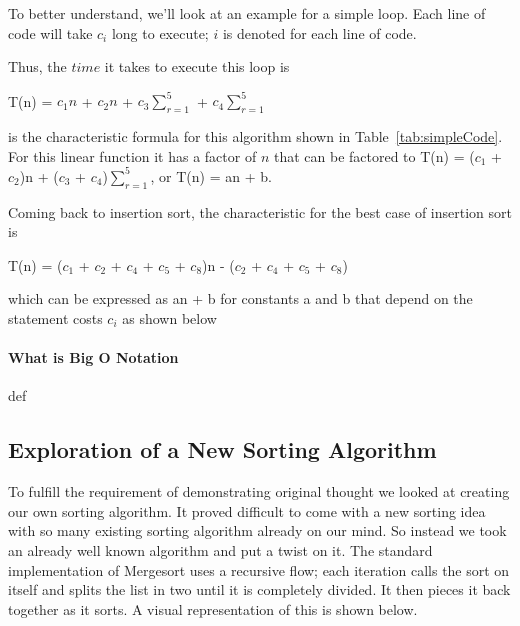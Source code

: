 \documentclass[12pt]{article}
\begin{document}
	To better understand, we’ll look at an example for a simple loop.
	Each line of code will take $c_i$ long to execute; $i$ is denoted for each line of code.
	
	
	
	Thus, the $\textit{time}$ it takes to execute this loop is
	\begin{center}
		T(n) = $c_1n$ + $c_2n$ + $c_3\sum_{r=1}^{5}$ + $c_4\sum_{r=1}^{5}$
	\end{center}
	is the characteristic formula for this algorithm shown in Table~\ref{tab:simpleCode}.
	For this linear function it has a factor of $n$ that can be factored to T(n) = ($c_1$ + $c_2$)n + ($c_3$ + $c_4$)$\sum_{r=1}^{5}$, or T(n) = an + b.
	
	Coming back to insertion sort, the characteristic for the best case of insertion sort is
	\begin{center}
		T(n) = ($c_1$ + $c_2$ + $c_4$ + $c_5$ + $c_8$)n - ($c_2$ + $c_4$ + $c_5$ + $c_8$)
	\end{center}
	which can be expressed as an + b for constants a and b that depend on the statement costs $c_i$ as shown below
	
	
	
	\paragraph{What is Big O Notation}
	
	def 
	
	\subsection{Exploration of a New Sorting Algorithm}
	
	
	To fulfill the requirement of demonstrating original thought we looked at creating our own sorting algorithm.
	 It proved difficult to come with a new sorting idea with so many existing sorting algorithm already on our mind.
	So instead we took an already well known algorithm and put a twist on it. 
	The standard implementation of Mergesort uses a recursive flow; each iteration calls the sort on itself and splits the list in two until it is completely divided. 
	It then pieces it back together as it sorts. 
	A visual representation of this is shown below.
	
\end{document}

